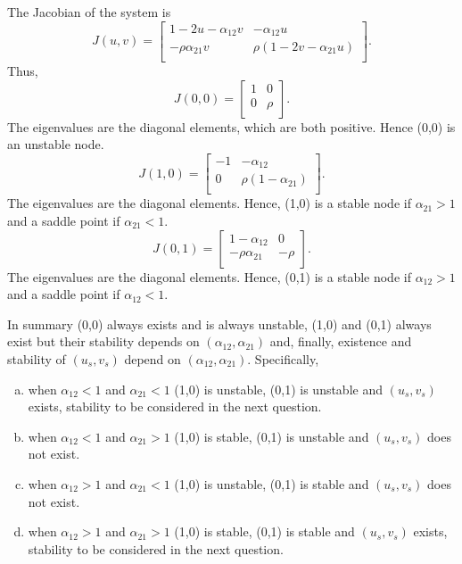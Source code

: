\documentclass[]{article}
\newcommand{\bb}{\begin{equation}}
\newcommand{\ee}{\end{equation}}
\renewcommand{\l}{\left(}
\renewcommand{\r}{\right)}
\begin{document}
\begin{Answ}
\subsubsection{}
The Jacobian of the system is
\bb
J(u,v)=\left[ {\begin{array}{cc}
   1-2u-\alpha_{12} v & -\alpha_{12}u \\
   -\rho\alpha_{21}v & \rho\l 1-2v-\alpha_{21} u\r \\
  \end{array} } \right].
\ee
Thus,
\bb
J(0,0)=\left[ {\begin{array}{cc}
   1 & 0 \\
   0 & \rho \\
  \end{array} } \right].
\ee
The eigenvalues are the diagonal elements, which are both positive. Hence (0,0) is an unstable node.
\bb
J(1,0)=\left[ {\begin{array}{cc}
   -1 & -\alpha_{12} \\
   0 & \rho(1-\alpha_{21}) \\
  \end{array} } \right].
\ee
The eigenvalues are the diagonal elements. Hence, (1,0) is a stable node if $\alpha_{21}>1$ and a saddle point if $\alpha_{21}<1$.
\bb
J(0,1)=\left[ {\begin{array}{cc}
   1-\alpha_{12} & 0 \\
   -\rho\alpha_{21} & -\rho \\
  \end{array} } \right].
\ee
The eigenvalues are the diagonal elements. Hence, (0,1) is a stable node if $\alpha_{12}>1$ and a saddle point if $\alpha_{12}<1$.


In summary (0,0) always exists and is always unstable, (1,0) and (0,1) always exist but their stability depends on $(\alpha_{12},\alpha_{21})$ and, finally, existence and stability of $(u_s,v_s)$ depend on $(\alpha_{12},\alpha_{21})$. Specifically,
\begin{enumerate}[(a)]
\item when $\alpha_{12}<1$ and $\alpha_{21}<1$ (1,0) is unstable, (0,1) is unstable and $(u_s, v_s)$ exists, stability to be considered in the next question.
\item when $\alpha_{12}<1$ and $\alpha_{21}>1$ (1,0) is stable, (0,1) is unstable and $(u_s,v_s)$ does not exist.
\item when $\alpha_{12}>1$ and $\alpha_{21}<1$ (1,0) is unstable, (0,1) is stable and $(u_s,v_s)$ does not exist.
\item when $\alpha_{12}>1$ and $\alpha_{21}>1$ (1,0) is stable, (0,1) is stable and $(u_s, v_s)$ exists, stability to be considered in the next question.
\end{enumerate}


\end{Answ}
\end{document}
